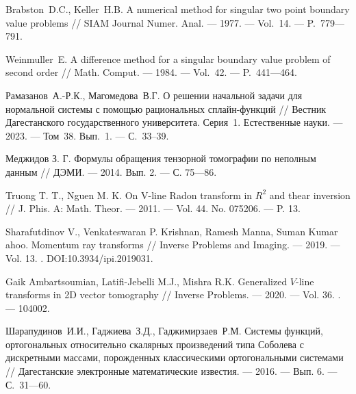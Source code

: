 \begin{thebibliography}{11}
Brabston~D.C., Keller~H.B. A numerical method for singular
 two point  boundary value problems
 // SIAM Journal Numer. Anal. --- 1977. --- Vol.~14. --- P.~779---791.





Weinmuller~E. A difference  method for a singular
 boundary value problem of second order
 // Math. Comput. --- 1984. --- Vol.~42. --- P.~441---464. 
 




Рамазанов~А.-Р.К., Магомедова~В.Г. О решении начальной задачи для 
нормальной системы с помощью рациональных сплайн-функций // Вестник Дагестанского 
государственного университета. Серия~1. Естественные науки. --- 2023. --- Том~38. Вып.~1. 
--- С.~33--39. 






Меджидов З. Г. Формулы обращения тензорной томографии по неполным данным // ДЭМИ. --- 2014. Вып. 2. --- С. 75---86.





Truong T. T., Nguen M. K. On V-line Radon transform in $R^2$   and thear inversion // J. Phis. A: Math. Theor. --- 2011. --- Vol. 44. No. 075206. --- P. 13.





\foreignlanguage{english}{%
Sharafutdinov V., Venkateswaran P. Krishnan, Ramesh Manna, Suman Kumar ahoo. Momentum ray transforms // Inverse Problems and Imaging. --- 2019. --- Vol. 13. . DOI:10.3934/ipi.2019031.
}%

Gaik Ambartsoumian, Latifi-Jebelli M.J., Mishra R.K.
Generalized $V$-line transforms in 2D vector tomography
//
Inverse Problems.
--- 2020.
--- Vol. 36. .
--- 104002.
  




{Шарапудинов~И.И., Гаджиева~З.Д., Гаджимирзаев~Р.М.} 
Системы функций, ортогональных относительно скалярных произведений типа Соболева с дискретными массами, порожденных классическими ортогональными системами 
// 
Дагестанские электронные математические известия. 
--- 2016. 
--- Вып. 6.
--- С.~31---60.






\end{thebibliography}
